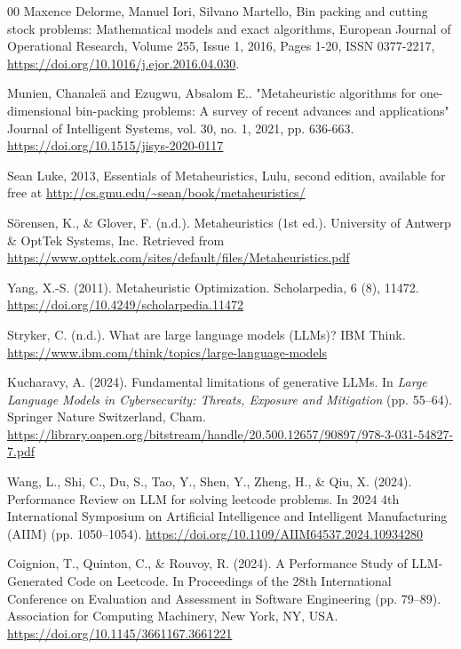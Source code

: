\documentclass[12pt]{article}
\begin{document}
\begin{thebibliography}{00}
 Maxence Delorme, Manuel Iori, Silvano Martello, Bin packing and cutting stock problems: Mathematical models and exact algorithms, European Journal of Operational Research, Volume 255, Issue 1, 2016, Pages 1-20, ISSN 0377-2217, \url{https://doi.org/10.1016/j.ejor.2016.04.030}.

 Munien, Chanaleä and Ezugwu, Absalom E.. "Metaheuristic algorithms for one-dimensional bin-packing problems: A survey of recent advances and applications" Journal of Intelligent Systems, vol. 30, no. 1, 2021, pp. 636-663. \url{https://doi.org/10.1515/jisys-2020-0117}

 Sean Luke, 2013, Essentials of Metaheuristics, Lulu, second edition, available for free at \url{http://cs.gmu.edu/~sean/book/metaheuristics/ }

 Sörensen, K., \& Glover, F. (n.d.). Metaheuristics (1st ed.). University of Antwerp \& OptTek Systems, Inc. Retrieved from \url{https://www.opttek.com/sites/default/files/Metaheuristics.pdf}

 Yang, X.-S. (2011). Metaheuristic Optimization. Scholarpedia, 6 (8), 11472. \url{https://doi.org/10.4249/scholarpedia.11472}

 Stryker, C. (n.d.). What are large language models (LLMs)? IBM Think. \url{https://www.ibm.com/think/topics/large-language-models}

 Kucharavy, A. (2024). Fundamental limitations of generative LLMs. In \textit{Large Language Models in Cybersecurity: Threats, Exposure and Mitigation} (pp. 55--64). Springer Nature Switzerland, Cham. \url{https://library.oapen.org/bitstream/handle/20.500.12657/90897/978-3-031-54827-7.pdf}

 Wang, L., Shi, C., Du, S., Tao, Y., Shen, Y., Zheng, H., \& Qiu, X. (2024). Performance Review on LLM for solving leetcode problems. In 2024 4th International Symposium on Artificial Intelligence and Intelligent Manufacturing (AIIM) (pp. 1050--1054). \url{https://doi.org/10.1109/AIIM64537.2024.10934280} 

 Coignion, T., Quinton, C., \& Rouvoy, R. (2024). A Performance Study of LLM-Generated Code on Leetcode. In Proceedings of the 28th International Conference on Evaluation and Assessment in Software Engineering (pp. 79--89). Association for Computing Machinery, New York, NY, USA. \url{https://doi.org/10.1145/3661167.3661221} 


\end{thebibliography}
\end{document}
